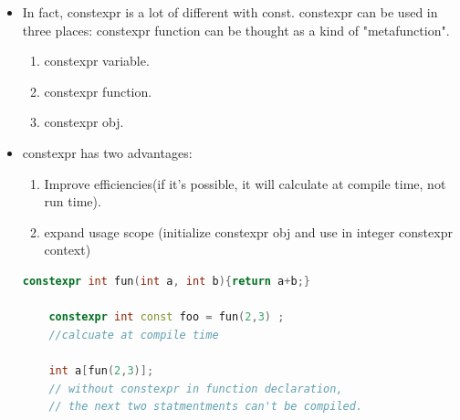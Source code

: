 \documentclass[a4paper,11pt,twoside]{book}
\begin{document}
\begin{itemize}
	\item In fact, constexpr is a lot of different with const. constexpr can be used in three places: constexpr function can be thought as a kind of "metafunction".
	\begin{enumerate}
		\item constexpr variable.
		\item constexpr function.
		\item constexpr obj.
	\end{enumerate}
	
	\item constexpr has two advantages:
	\begin{enumerate}
		\item Improve efficiencies(if it's possible, it will calculate at compile time, not run time). 
		\item expand usage scope (initialize constexpr obj and use in integer constexpr context)
	\end{enumerate}
	\begin{lstlisting}[frame=single, language=c++]
	constexpr int fun(int a, int b){return a+b;}
	
	constexpr int const foo = fun(2,3) ; 
	//calcuate at compile time
	
	int a[fun(2,3)];
	// without constexpr in function declaration,
	// the next two statmentments can't be compiled. 
	\end{lstlisting}
	
\end{itemize}
\end{document}
